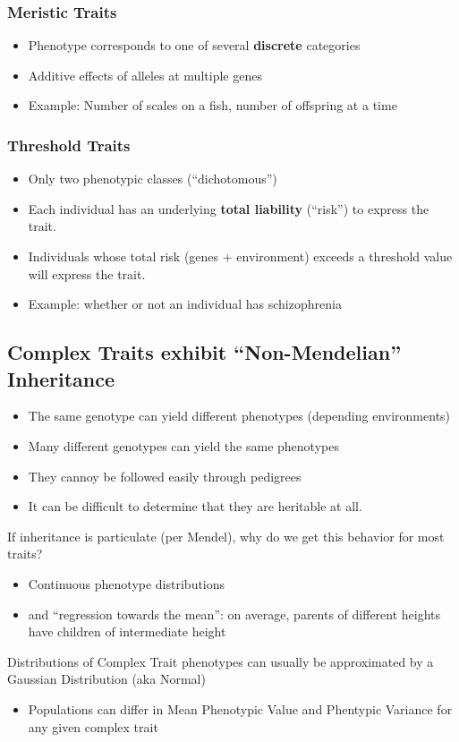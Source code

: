 \documentclass[10pt]{article}
\begin{document}
\subsubsection*{Meristic Traits}
\begin{itemize}
	\item Phenotype corresponds to one of several \textbf{discrete} categories
	\item Additive effects of alleles at multiple genes
	\item Example: Number of scales on a fish, number of offspring at a time
\end{itemize}

\subsubsection*{Threshold Traits}
\begin{itemize}
	\item Only two phenotypic classes (``dichotomous'')
	\item Each individual has an underlying \textbf{total liability} (``risk'') to express the trait.
	\item Individuals whose total risk (genes + environment) exceeds a threshold value will express the trait.
	\item Example: whether or not an individual has schizophrenia
\end{itemize}

\subsection*{Complex Traits exhibit ``Non-Mendelian'' Inheritance}
\begin{itemize}
	\item The same genotype can yield different phenotypes (depending environments)
	\item Many different genotypes can yield the same phenotypes
	\item They cannoy be followed easily through pedigrees
	\item It can be difficult to determine that they are heritable at all.
\end{itemize}
If inheritance is particulate (per Mendel), why do we get this behavior for most traits?
\begin{itemize}
	\item Continuous phenotype distributions
	\item and ``regression towards the mean'': on average, parents of different heights have children of intermediate height
\end{itemize}
Distributions of Complex Trait phenotypes can usually be approximated by a Gaussian Distribution (aka Normal)
\begin{itemize}
	\item Populations can differ in Mean Phenotypic Value and Phentypic Variance for any given complex trait
\end{itemize}
\end{document}
